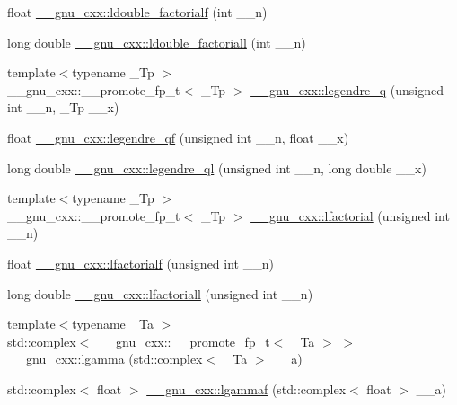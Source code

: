 \begin{DoxyCompactItemize}
\item 
float \hyperlink{group__gnu__math__spec__func_ga33ecc59a7ff139b483cebf42ecd4fe79}{\+\_\+\+\_\+gnu\+\_\+cxx\+::ldouble\+\_\+factorialf} (int \+\_\+\+\_\+n)
\item 
long double \hyperlink{group__gnu__math__spec__func_gae8fa4b4866cfd20349c985b33ed2936e}{\+\_\+\+\_\+gnu\+\_\+cxx\+::ldouble\+\_\+factoriall} (int \+\_\+\+\_\+n)
\item 
{\footnotesize template$<$typename \+\_\+\+Tp $>$ }\\\+\_\+\+\_\+gnu\+\_\+cxx\+::\+\_\+\+\_\+promote\+\_\+fp\+\_\+t$<$ \+\_\+\+Tp $>$ \hyperlink{group__gnu__math__spec__func_ga231012f205e697c7ce1bae78f8754104}{\+\_\+\+\_\+gnu\+\_\+cxx\+::legendre\+\_\+q} (unsigned int \+\_\+\+\_\+n, \+\_\+\+Tp \+\_\+\+\_\+x)
\item 
float \hyperlink{group__gnu__math__spec__func_gaedb2871cec8f0f160524205e9083621d}{\+\_\+\+\_\+gnu\+\_\+cxx\+::legendre\+\_\+qf} (unsigned int \+\_\+\+\_\+n, float \+\_\+\+\_\+x)
\item 
long double \hyperlink{group__gnu__math__spec__func_ga35de372a666b6d530d4b3704ff4a878b}{\+\_\+\+\_\+gnu\+\_\+cxx\+::legendre\+\_\+ql} (unsigned int \+\_\+\+\_\+n, long double \+\_\+\+\_\+x)
\item 
{\footnotesize template$<$typename \+\_\+\+Tp $>$ }\\\+\_\+\+\_\+gnu\+\_\+cxx\+::\+\_\+\+\_\+promote\+\_\+fp\+\_\+t$<$ \+\_\+\+Tp $>$ \hyperlink{group__gnu__math__spec__func_gaee28cc03db944a3e02fd10542016cfa8}{\+\_\+\+\_\+gnu\+\_\+cxx\+::lfactorial} (unsigned int \+\_\+\+\_\+n)
\item 
float \hyperlink{group__gnu__math__spec__func_ga65af05c4093d4895a564a8d67e389a9b}{\+\_\+\+\_\+gnu\+\_\+cxx\+::lfactorialf} (unsigned int \+\_\+\+\_\+n)
\item 
long double \hyperlink{group__gnu__math__spec__func_ga3a0c196f34916dc68c29c89f26cbe1ee}{\+\_\+\+\_\+gnu\+\_\+cxx\+::lfactoriall} (unsigned int \+\_\+\+\_\+n)
\item 
{\footnotesize template$<$typename \+\_\+\+Ta $>$ }\\std\+::complex$<$ \+\_\+\+\_\+gnu\+\_\+cxx\+::\+\_\+\+\_\+promote\+\_\+fp\+\_\+t$<$ \+\_\+\+Ta $>$ $>$ \hyperlink{group__gnu__math__spec__func_gaf70747491390b1bfc27b93ff4be6376e}{\+\_\+\+\_\+gnu\+\_\+cxx\+::lgamma} (std\+::complex$<$ \+\_\+\+Ta $>$ \+\_\+\+\_\+a)
\item 
std\+::complex$<$ float $>$ \hyperlink{group__gnu__math__spec__func_ga5b10ee6e92d8707a151b00086889b2ea}{\+\_\+\+\_\+gnu\+\_\+cxx\+::lgammaf} (std\+::complex$<$ float $>$ \+\_\+\+\_\+a)

\end{DoxyCompactItemize}
